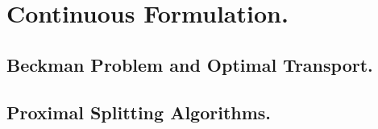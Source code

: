 \section{Continuous Formulation.}
\subsection{Beckman Problem and Optimal Transport.}
\subsection{Proximal Splitting Algorithms.}

